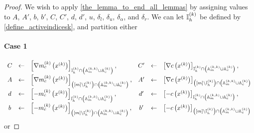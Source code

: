 \begin{proof}
We wish to apply \cref{the_lemma_to_end_all_lemmas} by assigning values to
$A$, $A'$, $b$, $b'$, $C$, $C'$, $d$, $d'$, $u$, $\delta_l$, $\delta_u$, $\delta_{\alpha}$, and $\delta_r$.
We can let ${ \mathbb I_h^{(k)} }$ be defined by \cref{define_activeindicesk}, and partition either

\paragraph{Case 1}
\begin{align*}
\begin{array}{cclccl}
C  &\gets& \left[\nabla m^{(k)}_c\left(x^{(k)}\right)\right]_{{ \mathbb I_h^{(k)} } \cap \left({\mathbb A_m^{(k, k)}} \cup {\mathbb A_c^{(k)}}\right)}, &
C' &\gets& \left[\nabla c\left(x^{(k)}\right)\right]_{{ \mathbb I_h^{(k)} } \cap \left({\mathbb A_m^{(k, k)}} \cup {\mathbb A_c^{(k)}}\right)}, \\
A  &\gets& \left[\nabla m^{(k)}_c\left(x^{(k)}\right)\right]_{\left([m] \setminus { \mathbb I_h^{(k)} }\right) \cap \left({\mathbb A_m^{(k, k)}} \cup {\mathbb A_c^{(k)}}\right)}, &
A' &\gets& \left[\nabla c\left(x^{(k)}\right)\right]_{\left([m] \setminus { \mathbb I_h^{(k)} }\right) \cap \left({\mathbb A_m^{(k, k)}} \cup {\mathbb A_c^{(k)}}\right)} \\
d  &\gets& \left[-m^{(k)}_c\left(x^{(k)}\right)\right]_{{ \mathbb I_h^{(k)} } \cap \left({\mathbb A_m^{(k, k)}} \cup {\mathbb A_c^{(k)}}\right)}, &
d' &\gets& \left[-c\left(x^{(k)}\right)\right]_{{ \mathbb I_h^{(k)} } \cap \left({\mathbb A_m^{(k, k)}} \cup {\mathbb A_c^{(k)}}\right)}, \\
b  &\gets& \left[-m^{(k)}_c\left(x^{(k)}\right)\right]_{\left([m] \setminus { \mathbb I_h^{(k)} }\right) \cap \left({\mathbb A_m^{(k, k)}} \cup {\mathbb A_c^{(k)}}\right)}, &
b' &\gets& \left[-c\left(x^{(k)}\right)\right]_{\left([m] \setminus { \mathbb I_h^{(k)} }\right) \cap \left({\mathbb A_m^{(k, k)}} \cup {\mathbb A_c^{(k)}}\right)} \\
\end{array}
\end{align*}
or

\end{proof}
